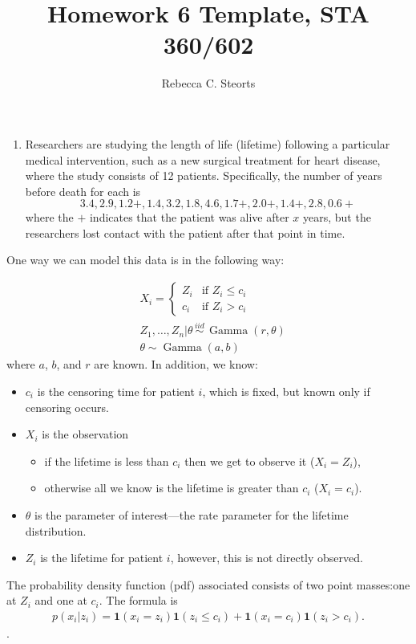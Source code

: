 \documentclass[
]{article}
\title{Homework 6 Template, STA 360/602}
\author{Rebecca C. Steorts}
\date{}
\providecommand{\tightlist}{%
  \setlength{\itemsep}{0pt}\setlength{\parskip}{0pt}}
\DeclareMathOperator*{\Ga}{Gamma}
\newcommand{\branch}[4]{
\left\{
	\begin{array}{ll}
		#1  & \mbox{if } #2 \\
		#3 & \mbox{if } #4
	\end{array}
\right.
}
\begin{document}
\maketitle

\begin{enumerate}
\def\labelenumi{\arabic{enumi}.}
\setcounter{enumi}{1}
\tightlist
\item
  Researchers are studying the length of life (lifetime) following a
  particular medical intervention, such as a new surgical treatment for
  heart disease, where the study consists of 12 patients. Specifically,
  the number of years before death for each is
  \[3.4, 2.9, 1.2+, 1.4, 3.2, 1.8, 4.6, 1.7+, 2.0+, 1.4+, 2.8, 0.6+\]
  where the \(+\) indicates that the patient was alive after \(x\)
  years, but the researchers lost contact with the patient after that
  point in time.
\end{enumerate}

One way we can model this data is in the following way:

\begin{align}
  &X_i = \branch{Z_i}{Z_i \leq c_i}{c_i}{Z_i > c_i}\\
     & Z_1,\ldots,Z_n|\theta\,\stackrel{iid}{\sim} \,\Ga(r,\theta)\\
    & \theta\sim \Ga(a, b)
\end{align} where \(a\), \(b\), and \(r\) are known. In addition, we
know:

\begin{itemize}
\item $c_i$ is the censoring time for patient $i$, which is fixed, but known only if censoring occurs.
\item $X_i$ is the observation
\begin{itemize}
\item if the lifetime is less than $c_i$ then we get to observe it ($X_i = Z_i$),
\item otherwise
        all we know is the lifetime is greater than $c_i$ ($X_i = c_i$).
        \end{itemize}
    \item $\theta$ is the parameter of interest---the rate parameter for the lifetime distribution.
    \item $Z_i$ is the lifetime for patient $i$, however, this is not directly observed.
    \end{itemize}

The probability density function (pdf) associated consists of two point
masses:one at \(Z_i\) and one at \(c_i\). The formula is \begin{align*}
p(x_i|z_i) = \bm{1}(x_i = z_i)\bm{1}(z_i \leq c_i) + \bm{1}(x_i=c_i)\bm{1}(z_i > c_i).
\end{align*}.
\end{document}
